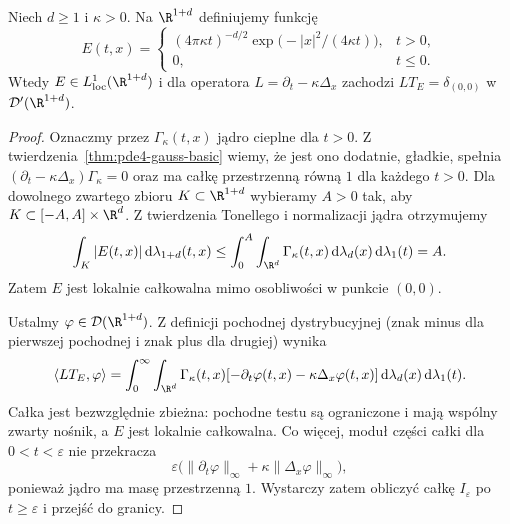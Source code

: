 \begin{twierdzenie}
\label{thm:pde7-heat}
Niech $d\ge1$ i $\kappa>0$. Na $\R^{1+d}$ definiujemy
funkcję
\[
 E(t,x)=\begin{cases}
 (4\pi\kappa t)^{-d/2}
 \exp\!\bigl(-|x|^2/(4\kappa t)\bigr),&t>0,\\
 0,&t\le0.
 \end{cases}
\]
Wtedy $E\in L^1_{\mathrm{loc}}(\R^{1+d})$ i dla
operatora $L=\partial_t-\kappa\Delta_x$ zachodzi
$L T_E=\delta_{(0,0)}$ w $\mathcal D'(\R^{1+d})$.
\end{twierdzenie}
\begin{proof}
Oznaczmy przez $\Gamma_\kappa(t,x)$ jądro cieplne
dla $t>0$. Z twierdzenia~\ref{thm:pde4-gauss-basic}
wiemy, że jest ono dodatnie, gładkie, spełnia
$(\partial_t-\kappa\Delta_x)\Gamma_\kappa=0$ oraz
ma całkę przestrzenną równą $1$ dla każdego $t>0$.
Dla dowolnego zwartego zbioru
$K\subset\R^{1+d}$ wybieramy $A>0$ tak, aby
$K\subset[-A,A]\times\R^d$.
Z twierdzenia Tonellego i normalizacji jądra
otrzymujemy
\[
 \int_K|E(t,x)|\,\mathrm d\lambda_{1+d}(t,x)
 \le\int_0^A\int_{\R^d}\Gamma_\kappa(t,x)
 \,\mathrm d\lambda_d(x)\,\mathrm d\lambda_1(t)=A.
\]
Zatem $E$ jest lokalnie całkowalna mimo osobliwości
w punkcie $(0,0)$.

Ustalmy $\varphi\in\mathcal D(\R^{1+d})$.
Z definicji pochodnej dystrybucyjnej (znak minus
dla pierwszej pochodnej i znak plus dla drugiej)
wynika
\[
 \langle LT_E,\varphi\rangle
 =\int_0^\infty\int_{\R^d}\Gamma_\kappa(t,x)
 [-\partial_t\varphi(t,x)-\kappa\Delta_x\varphi(t,x)]
 \,\mathrm d\lambda_d(x)\,\mathrm d\lambda_1(t).
\]
Całka jest bezwzględnie zbieżna: pochodne testu
są ograniczone i mają wspólny zwarty nośnik,
a $E$ jest lokalnie całkowalna. Co więcej,
moduł części całki dla $0<t<\varepsilon$ nie
przekracza
\[
 \varepsilon
 \bigl(\|\partial_t\varphi\|_\infty+
             \kappa\|\Delta_x\varphi\|_\infty\bigr),
\]
ponieważ jądro ma masę przestrzenną $1$.
Wystarczy zatem obliczyć całkę $I_\varepsilon$
po $t\ge\varepsilon$ i przejść do granicy.


\end{proof}
